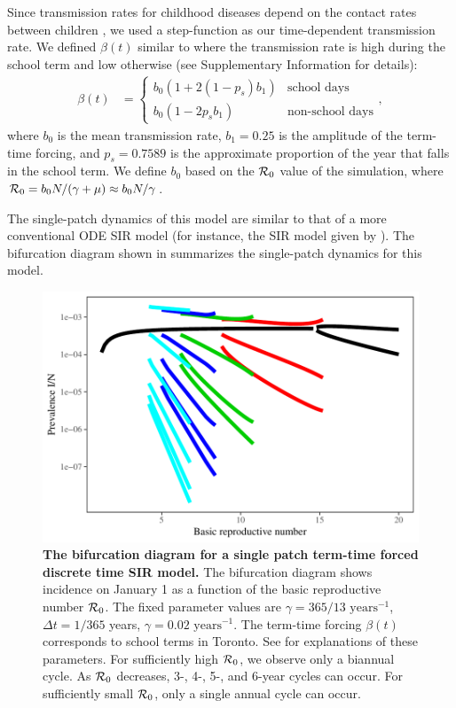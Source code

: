 \documentclass[12pt]{article}
\newcommand{\R}{{\cal R}}
\begin{document}
Since transmission rates for childhood diseases depend on the contact rates between children \cite{keeling2002understanding}, we used a step-function as our time-dependent transmission rate. We defined $\beta (t)$ similar to \cite{bauch2003interepidemic} where the transmission rate is high during the school term and low otherwise (see Supplementary Information for details):
\begin{equation}
\begin{aligned}
\beta (t) &=
\begin{cases} b_0 (1 + 2(1 - p_s) b_1) &\mbox{school days} \\
b_0 (1 - 2 p_s b_1) & \mbox{non-school days}
\end{cases},
\end{aligned}
\end{equation}
where $b_0$ is the mean transmission rate, $b_1 = 0.25$ is the amplitude of the term-time forcing, and $p_s = 0.7589$ is the approximate proportion of the year that falls in the school term. We define $b_0$ based on the $\R_0$ value of the simulation, where $\R_0 = b_0 N / (\gamma + \mu) \approx b_0 N / \gamma$.

The single-patch dynamics of this model are similar to that of a more conventional ODE SIR model (for instance, the SIR model given by \cite{earn2000simple}). The bifurcation diagram shown in  summarizes the single-patch dynamics for this model.

\begin{figure}
\centering
\includegraphics[width=\textwidth]{supplementary/bifurcation.pdf}
\caption{\textbf{The bifurcation diagram for a single patch term-time forced discrete time SIR model.}
The bifurcation diagram shows incidence on January 1 as a function of the basic reproductive number $\R_0$. The fixed parameter values are $\gamma = 365/13 \textrm{ years}^{-1}$, $\Delta t = 1/365$ years, $\gamma = 0.02 \textrm{ years}^{-1}$. The term-time forcing $\beta(t)$ corresponds to school terms in Toronto. See  for explanations of these parameters. For sufficiently high $\R_0$, we observe only a biannual cycle. As $\R_0$ decreases, 3-, 4-, 5-, and 6-year cycles can occur. For sufficiently small $\R_0$, only a single annual cycle can occur. }
\label{fig:bifurcation}
\end{figure}
\end{document}
